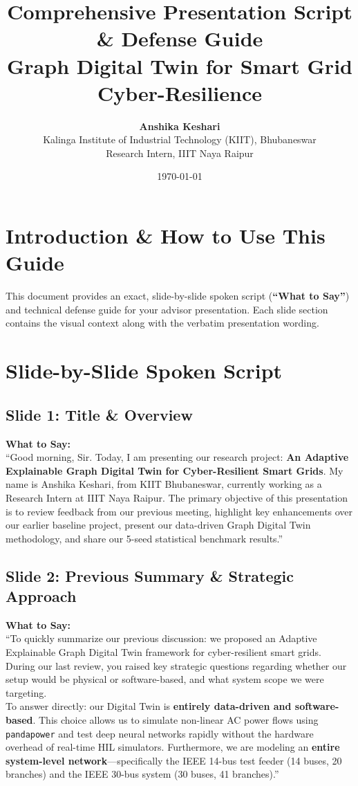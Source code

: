 \documentclass[11pt,a4paper]{article}
\title{\textbf{Comprehensive Presentation Script \& Defense Guide}\\ \large Graph Digital Twin for Smart Grid Cyber-Resilience}
\author{\textbf{Anshika Keshari} \\ Kalinga Institute of Industrial Technology (KIIT), Bhubaneswar \\ Research Intern, IIIT Naya Raipur}
\date{\today}
\begin{document}
\maketitle

\tableofcontents
\newpage

\section{Introduction \& How to Use This Guide}
This document provides an exact, slide-by-slide spoken script (\textbf{``What to Say''}) and technical defense guide for your advisor presentation. Each slide section contains the visual context along with the verbatim presentation wording.

\section{Slide-by-Slide Spoken Script}

\subsection{Slide 1: Title \& Overview}
\begin{mdframed}[style=saystyle]
\textbf{What to Say:}\\
``Good morning, Sir. Today, I am presenting our research project: \textbf{An Adaptive Explainable Graph Digital Twin for Cyber-Resilient Smart Grids}. My name is Anshika Keshari, from KIIT Bhubaneswar, currently working as a Research Intern at IIIT Naya Raipur. The primary objective of this presentation is to review feedback from our previous meeting, highlight key enhancements over our earlier baseline project, present our data-driven Graph Digital Twin methodology, and share our 5-seed statistical benchmark results.''
\end{mdframed}

\subsection{Slide 2: Previous Summary \& Strategic Approach}
\begin{mdframed}[style=saystyle]
\textbf{What to Say:}\\
``To quickly summarize our previous discussion: we proposed an Adaptive Explainable Graph Digital Twin framework for cyber-resilient smart grids. During our last review, you raised key strategic questions regarding whether our setup would be physical or software-based, and what system scope we were targeting.\\

To answer directly: our Digital Twin is \textbf{entirely data-driven and software-based}. This choice allows us to simulate non-linear AC power flows using \texttt{pandapower} and test deep neural networks rapidly without the hardware overhead of real-time HIL simulators. Furthermore, we are modeling an \textbf{entire system-level network}---specifically the IEEE 14-bus test feeder (14 buses, 20 branches) and the IEEE 30-bus system (30 buses, 41 branches).''
\end{mdframed}
\end{document}
